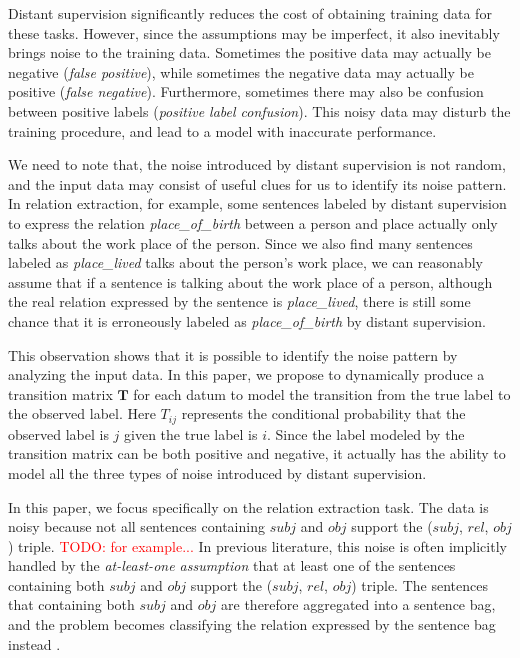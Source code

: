 \documentclass[11pt,a4paper]{article}
\newcommand{\todo}[1]{\textcolor{red}{TODO: #1}\PackageWarning{TODO:}{#1!}}
\begin{document}
Distant supervision significantly reduces the cost of obtaining training data for these tasks. However, since the assumptions may be imperfect, it also inevitably brings noise to the training data.  Sometimes the positive data may actually be negative (\emph{false positive}), while sometimes the negative data may actually be positive (\emph{false negative}). Furthermore, sometimes there may also be confusion between positive labels (\emph{positive label confusion}). This noisy data may disturb the training procedure, and lead to a model with inaccurate performance.

We need to note that, the noise introduced by distant supervision is not random, and the input data may consist of useful clues for us to identify its noise pattern. In relation extraction, for example, some sentences labeled by distant supervision to express the relation \emph{place\_of\_birth} between a person and place actually only talks about the work place of the person. Since we also find many sentences labeled as \emph{place\_lived} talks about the person's work place, we can reasonably assume that if a sentence is talking about the work place of a person, although the real relation expressed by the sentence is \emph{place\_lived}, there is still some chance that it is erroneously labeled as \emph{place\_of\_birth} by distant supervision.

This observation shows that it is possible to identify the noise pattern by analyzing the input data. In this paper, we propose to dynamically produce a transition matrix $\mathbf{T}$ for each datum to model the transition from the true label to the observed label. Here $T_{ij}$ represents the conditional probability that the observed label is $j$ given the true label is $i$. Since the label modeled by the transition matrix can be both positive and negative, it actually has the ability to model all the three types of noise introduced by distant supervision.



In this paper, we focus specifically on the relation extraction task. The data is noisy because not all sentences containing $subj$ and $obj$ support the ($subj$, $rel$, $obj$) triple. \todo{for example...} In previous literature, this noise is often implicitly handled by the \emph{at-least-one assumption} that at least one of the sentences containing both $subj$ and $obj$ support the ($subj$, $rel$, $obj$) triple. The  sentences that containing both $subj$ and $obj$ are therefore aggregated into a sentence bag, and the problem becomes classifying the relation expressed by the sentence bag instead \cite{riedel2010modeling,lin2016neural}.
\end{document}
